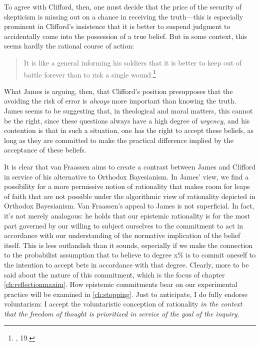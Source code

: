 To agree with Clifford, then, one must decide that the price of the
security of skepticism is missing out on a chance in receiving the
truth---this is especially prominent in Clifford's insistence that it is
better to suspend judgment to accidentally come into the possession of a
true belief. But in some context, this seems hardly the rational course
of action:

\begin{quote}
It is like a general informing his soldiers that it is better to keep
out of battle forever than to risk a single wound.\footnote{\cite{jameswill}, 19.}
\end{quote}

What James is arguing, then, that Clifford's position presupposes that
the avoiding the risk of error is \emph{always} more important than
knowing the truth. James seems to be suggesting that, in theological and
moral matters, this cannot be the right, since these questions always
have a high degree of \emph{urgency}, and his contention is that in such
a situation, one has the right to accept these beliefs, as long as they
are committed to make the practical difference implied by the acceptance
of these beliefs.

It is clear that van Fraassen aims to create a contrast between James
and Clifford in service of his alternative to Orthodox Bayesianism. In
James' view, we find a possibility for a more permissive notion of
rationality that makes room for leaps of faith that are not possible
under the algorithmic view of rationality depicted in Orthodox
Bayesianism. Van Fraassen's appeal to James is not superficial. In fact, it's not merely analogous: he holds that our epistemic rationality is for the most part governed by our willing to subject ourselves to the commitment to act in accordance with our understanding of the normative implication of the belief itself. This is less outlandish than it sounds, especially if we make the connection to the probabilist assumption that to believe to degree x\% is to commit oneself to the intention to accept bets in accordance with that degree.  Clearly, more to be said about the nature of this commitment, which is the focus of chapter \ref{ch:reflectionmaxim}. How epistemic commitments bear on our experimental practice will be examined in \ref{ch:stopping}. Just to anticipate, I do fully endorse voluntarism: I accept the voluntaristic conception of rationality \emph{in the context that the freedom of thought is prioritized in service of the goal of the inquiry.}  


